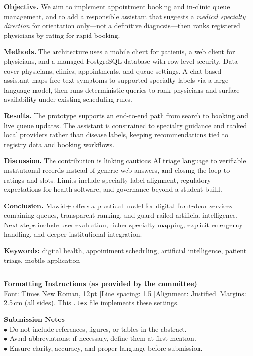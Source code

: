 \documentclass[12pt,a4paper]{article}
\begin{document}
\noindent\textbf{Objective.}
We aim to implement appointment booking and in-clinic queue management, and to add a responsible assistant that suggests a \emph{medical specialty direction} for orientation only---not a definitive diagnosis---then ranks registered physicians by rating for rapid booking.

\noindent\textbf{Methods.}
The architecture uses a mobile client for patients, a web client for physicians, and a managed PostgreSQL database with row-level security. Data cover physicians, clinics, appointments, and queue settings. A chat-based assistant maps free-text symptoms to supported specialty labels via a large language model, then runs deterministic queries to rank physicians and surface availability under existing scheduling rules.

\noindent\textbf{Results.}
The prototype supports an end-to-end path from search to booking and live queue updates. The assistant is constrained to specialty guidance and ranked local providers rather than disease labels, keeping recommendations tied to registry data and booking workflows.

\noindent\textbf{Discussion.}
The contribution is linking cautious AI triage language to verifiable institutional records instead of generic web answers, and closing the loop to ratings and slots. Limits include specialty label alignment, regulatory expectations for health software, and governance beyond a student build.

\noindent\textbf{Conclusion.}
Mawid+ offers a practical model for digital front-door services combining queues, transparent ranking, and guard-railed artificial intelligence. Next steps include user evaluation, richer specialty mapping, explicit emergency handling, and deeper institutional integration.

\vspace{0.9em}
\noindent\textbf{Keywords:} digital health, appointment scheduling, artificial intelligence, patient triage, mobile application

\vspace{1.2em}
\noindent\rule{\textwidth}{0.35pt}
\vspace{0.5em}

\noindent\textbf{Formatting Instructions (as provided by the committee)}\\
Font: Times New Roman, 12\,pt \quad|\quad Line spacing: 1.5 \quad|\quad Alignment: Justified \quad|\quad Margins: 2.5\,cm (all sides). This \texttt{.tex} file implements these settings.

\vspace{0.45em}
\noindent\textbf{Submission Notes}\\
$\bullet$ Do not include references, figures, or tables in the abstract.\\
$\bullet$ Avoid abbreviations; if necessary, define them at first mention.\\
$\bullet$ Ensure clarity, accuracy, and proper language before submission.
\end{document}
